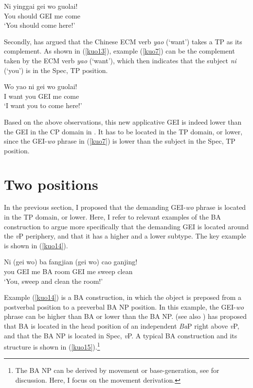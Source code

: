 \documentclass[output=paper,colorlinks,citecolor=brown]{langscibook}
\begin{document}
\ea
\label{kuo12}
\gll Ni     yinggai gei wo  guolai!\\  
     You    should  GEI me  come\\ 
\glt `You should come here!'
\z

Secondly, \citet{Li1990} has argued that the Chinese ECM verb \textit{yao} (`want') takes a TP as its complement. As shown in (\ref{kuo13}), example (\ref{kuo7}) can be the complement taken by the ECM verb \textit{yao} (`want'), which then indicates that the subject \textit{ni} (`you') is in the Spec, TP position. 

\ea
\label{kuo13}
\gll Wo yao     ni gei wo  guolai!\\  
     I  want    you GEI me  come\\ 
\glt `I want you to come here!'
\z

Based on the above observations, this new applicative GEI is indeed lower than the GEI in the CP domain in \citet{Tsai2017}. It has to be located in the TP domain, or lower, since the GEI-\textit{wo} phrase in (\ref{kuo7}) is lower than the subject in the Spec, TP position.

\section{Two positions}\label{sect3}

In the previous section, I proposed that the demanding GEI-\textit{wo} phrase is located in the TP domain, or lower. Here, I refer to relevant examples of the BA construction to argue more specifically that the demanding GEI is located around the \textit{v}P periphery, and that it has a higher and a lower subtype. The key example is shown in (\ref{kuo14}).

\ea
\label{kuo14}
\gll Ni     (gei wo)    ba  fangjian    (gei wo)    cao     ganjing!\\  
     you     GEI me     BA  room         GEI me     sweep   clean  \\ 
\glt `You, sweep and clean the room!'
\z

Example (\ref{kuo14}) is a BA construction, in which the object is preposed from a postverbal position to a preverbal BA NP position. In this example, the GEI-\textit{wo} phrase can be higher than BA or lower than the BA NP. \citet{Li2006} (see also \citealt{Haugnlili2009}) has proposed that BA is located in the head position of an independent \textit{Ba}P right above \textit{v}P, and that the BA NP is located in Spec, \textit{v}P. A typical BA construction and its structure is shown in (\ref{kuo15}).\footnote{The BA NP can be derived by movement or base-generation, see \citet{Li1&Thompson} for discussion. Here, I focus on the movement derivation.}
\end{document}

